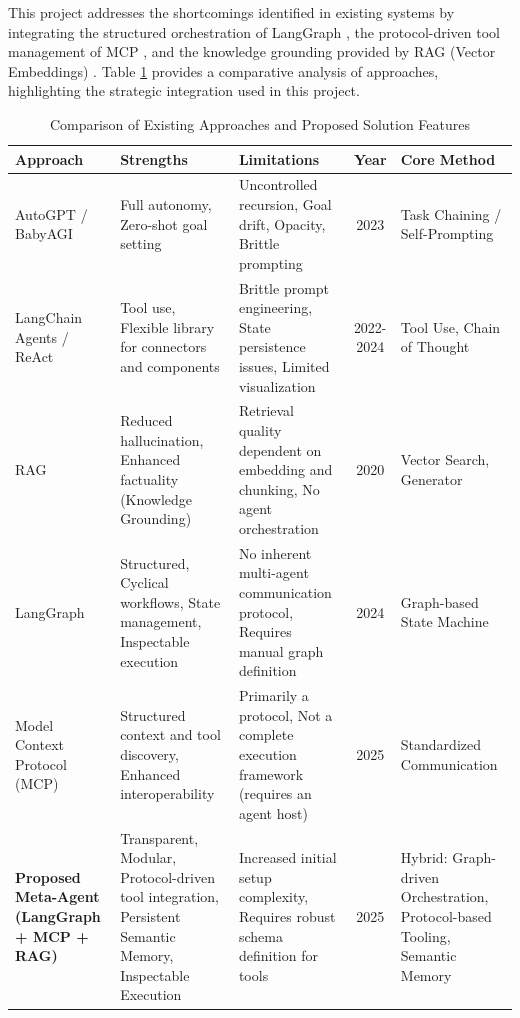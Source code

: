 \documentclass[lettersize,journal]{IEEEtran}
\begin{document}
This project addresses the shortcomings identified in existing systems by integrating the structured orchestration of LangGraph \cite{wang2024agent}, the protocol-driven tool management of MCP \cite{krishnan2025advancing}, and the knowledge grounding provided by RAG (Vector Embeddings) \cite{lewis2020retrieval}. Table \ref{tab:comparison} provides a comparative analysis of approaches, highlighting the strategic integration used in this project.

\begin{table}[htbp]
\centering
\caption{Comparison of Existing Approaches and Proposed Solution Features}
\label{tab:comparison}
\begin{tabular}{p{3cm} p{3.5cm} p{3.5cm} c p{3cm}}
\toprule
\textbf{Approach} & \textbf{Strengths} & \textbf{Limitations} & \textbf{Year} & \textbf{Core Method} \\
\midrule
AutoGPT / BabyAGI & Full autonomy, Zero-shot goal setting & Uncontrolled recursion, Goal drift, Opacity, Brittle prompting & 2023 & Task Chaining / Self-Prompting \\
\midrule
LangChain Agents / ReAct & Tool use, Flexible library for connectors and components & Brittle prompt engineering, State persistence issues, Limited visualization & 2022-2024 & Tool Use, Chain of Thought \\
\midrule
RAG \cite{lewis2020retrieval, tural2024retrieval} & Reduced hallucination, Enhanced factuality (Knowledge Grounding) & Retrieval quality dependent on embedding and chunking, No agent orchestration & 2020 & Vector Search, Generator \\
\midrule
LangGraph \cite{wang2024agent} & Structured, Cyclical workflows, State management, Inspectable execution & No inherent multi-agent communication protocol, Requires manual graph definition & 2024 & Graph-based State Machine \\
\midrule
Model Context Protocol (MCP) \cite{krishnan2025advancing, ahn2025agentic} & Structured context and tool discovery, Enhanced interoperability & Primarily a protocol, Not a complete execution framework (requires an agent host) & 2025 & Standardized Communication \\
\midrule
\textbf{Proposed Meta-Agent (LangGraph + MCP + RAG)} & Transparent, Modular, Protocol-driven tool integration, Persistent Semantic Memory, Inspectable Execution & Increased initial setup complexity, Requires robust schema definition for tools & 2025 & Hybrid: Graph-driven Orchestration, Protocol-based Tooling, Semantic Memory \\
\bottomrule
\end{tabular}
\end{table}
\end{document}
